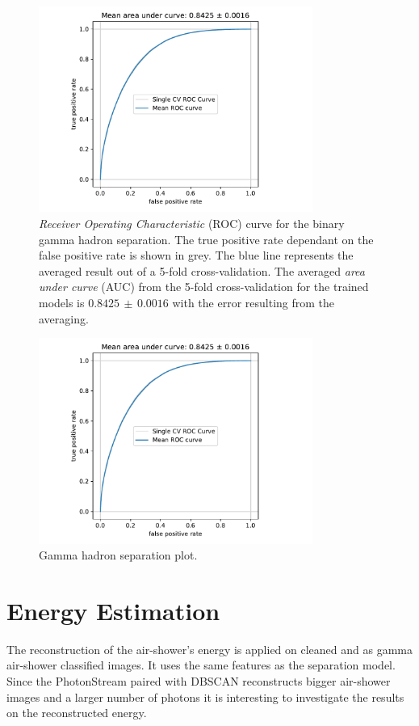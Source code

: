\begin{figure}
  \centering
  \includegraphics[width=0.8\textwidth, page=1]{Plots/results/DBSCAN/separation_performance.pdf}
  \caption{\textit{Receiver Operating Characteristic} (ROC) curve for the binary gamma hadron separation. The true positive rate dependant on the false positive rate is shown in grey. The blue line represents the averaged result out of a 5-fold cross-validation. The averaged \textit{area under curve} (AUC) from the 5-fold cross-validation for the trained models is $0.8425\,\pm\,0.0016$ with the error resulting from the averaging.}
  \label{fig:sep_auc}
\end{figure}
%
%
\begin{figure}
  \centering
  \includegraphics[width=0.8\textwidth, page=3]{Plots/results/DBSCAN/separation_performance.pdf}
  \caption{Gamma hadron separation plot.}
  \label{fig:sep2}
\end{figure}
%
\section{Energy Estimation}
%
The reconstruction of the air-shower's energy is applied on cleaned and as
gamma air-shower classified images. It uses the same features as the separation
model. Since the PhotonStream paired with DBSCAN reconstructs bigger air-shower
images and a larger number of photons it is interesting to investigate the
results on the reconstructed energy.

